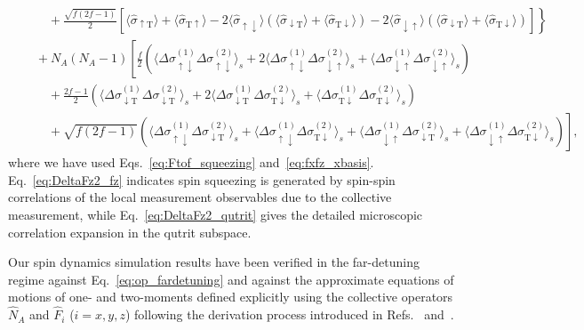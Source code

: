 \documentclass[preprint,aps,pra,onecolumn,superscriptaddress]{revtex4-1} %
\newcommand{\nn}{\nonumber}
\newcommand{\expect}[1]{\big\langle #1 \big\rangle}
\newcommand{\sigmaud}{\hat{\sigma}_{\uparrow\downarrow}}
\newcommand{\sigmaut}{\hat{\sigma}_{\uparrow \mathrm{T}}}
\newcommand{\sigmadu}{\hat{\sigma}_{\downarrow\uparrow}}
\newcommand{\sigmadt}{\hat{\sigma}_{\downarrow \mathrm{T}}}
\newcommand{\sigmatu}{\hat{\sigma}_{\mathrm{T}\uparrow}}
\newcommand{\sigmatd}{\hat{\sigma}_{\mathrm{T}\downarrow}}
\newcommand{\Dsigmaud}{\Delta\sigma_{\uparrow\downarrow}}
\newcommand{\Dsigmadu}{\Delta\sigma_{\downarrow\uparrow}}
\newcommand{\Dsigmadt}{\Delta\sigma_{\downarrow \mathrm{T}}}
\newcommand{\Dsigmatd}{\Delta\sigma_{\mathrm{T}\downarrow}}
\begin{document}
\begin{appendix}
\begin{subequations}
\begin{align}
	&\quad\quad +\left. \frac{\sqrt{f(2f-1)}}{2}\left[\expect{\sigmaut }+\expect{\sigmatu} -2\expect{\sigmaud}(\expect{\sigmadt}+\expect{\sigmatd}) -2\expect{\sigmadu}(\expect{\sigmadt}+\expect{\sigmatd} ) \right] \right\}\nn\\
	&\quad +N_A(N_A-1)\left[\frac{f}{2}(\expect{\Dsigmaud^{(1)}\Dsigmaud^{(2)} }_s +2\expect{\Dsigmaud^{(1)}\Dsigmadu^{(2)} }_s+\expect{\Dsigmadu^{(1)}\Dsigmadu^{(2)} }_s )\right. \label{eq:DeltaFz2_qutrit}\\
	&\quad\quad + \frac{2f-1}{2}(\expect{\Dsigmadt^{(1)}\Dsigmadt^{(2)} }_s +2\expect{\Dsigmadt^{(1)}\Dsigmatd^{(2)} }_s +\expect{\Dsigmatd^{(1)}\Dsigmatd^{(2)} }_s) \nn\\
	&\quad\quad + \left. \sqrt{f(2f-1)}(\expect{\Dsigmaud^{(1)}\Dsigmadt^{(2)} }_s +\expect{\Dsigmaud^{(1)}\Dsigmatd^{(2)} }_s +\expect{\Dsigmadu^{(1)}\Dsigmadt^{(2)} }_s+\expect{\Dsigmadu^{(1)}\Dsigmatd^{(2)} }_s )\right],\nn
	\end{align}
\end{subequations}
where we have used Eqs.~\eqref{eq:Ftof_squeezing} and~\eqref{eq:fxfz_xbasis}. Eq.~\eqref{eq:DeltaFz2_fz} indicates spin squeezing is generated by spin-spin correlations of the local measurement observables due to the collective measurement, while Eq.~\eqref{eq:DeltaFz2_qutrit} gives the detailed microscopic correlation expansion in the qutrit subspace.

Our spin dynamics simulation results have been verified in the far-detuning regime against Eq.~\eqref{eq:op_fardetuning} and against the approximate equations of motions of one- and two-moments defined explicitly using the collective operators $ \hat{N}_A $ and $ \hat{F}_i $ ($ i=x,y,z $) following the derivation process introduced in Refs.~\cite{Qi2016} and~\cite{Norris2014}.



\end{appendix}
\end{document}
